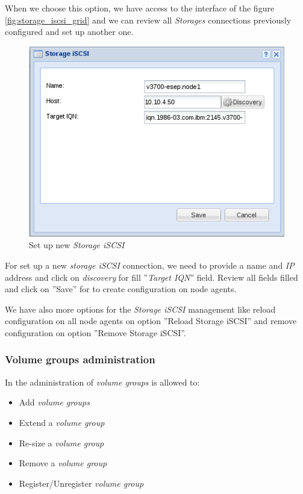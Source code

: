 When we choose this option, we have access to the interface of the figure \ref{fig:storage_iscsi_grid} and we can review all \emph{Storages} connections previously configured and set up another one.

\begin{figure}[H]
        \begin{center}
        \includegraphics[scale=0.45]{screenshots/node_storage_iscsi_new.png}
        \caption{Set up new \emph{Storage iSCSI} }
        \label{fig:storage_iscsi_new}
        \end{center}
\end{figure}

For set up a new \emph{storage iSCSI} connection, we need to provide a name and \emph{IP} address and click on \emph{discovery} for fill ''\emph{Target IQN}'' field. Review all fields filled and click on ''Save'' for to create configuration on node agents.

We have also more options for the \emph{Storage iSCSI} management like reload configuration on all node agents on option ''Reload Storage iSCSI'' and remove configuration on option ''Remove Storage iSCSI''.


\subsubsection{Volume groups administration}
In the administration of \emph{volume groups} is allowed to:
\begin{itemize}
	\item Add \emph{volume groups}
	\item Extend a \emph{volume group}
	\item Re-size a \emph{volume group}
	\item Remove a \emph{volume group}
	\item Register/Unregister \emph{volume group}
\end{itemize}

